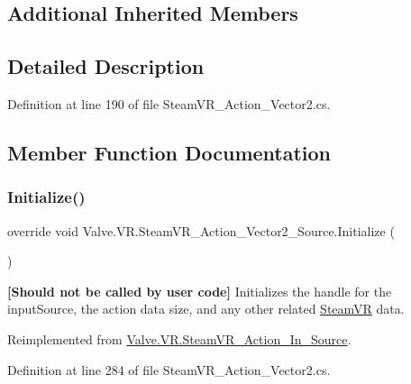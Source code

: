 \subsection*{Additional Inherited Members}


\subsection{Detailed Description}


Definition at line 190 of file Steam\+V\+R\+\_\+\+Action\+\_\+\+Vector2.\+cs.



\subsection{Member Function Documentation}
\mbox{\label{class_valve_1_1_v_r_1_1_steam_v_r___action___vector2___source_a0633b07e1292cf9a235cf51f7cb117e8}} 
\subsubsection{\texorpdfstring{Initialize()}{Initialize()}}
{\footnotesize\ttfamily override void Valve.\+V\+R.\+Steam\+V\+R\+\_\+\+Action\+\_\+\+Vector2\+\_\+\+Source.\+Initialize (\begin{DoxyParamCaption}{ }\end{DoxyParamCaption})\hspace{0.3cm}{\ttfamily [virtual]}}



{\bfseries{\mbox{[}Should not be called by user code\mbox{]}}} Initializes the handle for the input\+Source, the action data size, and any other related \mbox{\hyperlink{class_valve_1_1_v_r_1_1_steam_v_r}{Steam\+VR}} data. 



Reimplemented from \mbox{\hyperlink{class_valve_1_1_v_r_1_1_steam_v_r___action___in___source_a15f00851d0666c0f9f1836bf481f4f70}{Valve.\+V\+R.\+Steam\+V\+R\+\_\+\+Action\+\_\+\+In\+\_\+\+Source}}.



Definition at line 284 of file Steam\+V\+R\+\_\+\+Action\+\_\+\+Vector2.\+cs.

